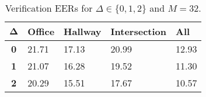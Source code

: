 \begin{table}[h]
    \centering
    \begin{tabular}{|c|M{2cm}|M{2cm}|M{2cm}|M{2cm}|}
    \hline
    $\boldsymbol{\Delta}$ & \bf{Office} & \bf{Hallway} & \bf{Intersection} & \bf{All} \\ 
    \hline 
    \hline
    \bf{0} & 21.71 & 17.13 & 20.99 & 12.93 \\
    \hline
    \bf{1} & 21.07 & 16.28 & 19.52 & 11.30 \\
    \hline
    \bf{2} & 20.29 & 15.51 & 17.67 & 10.57 \\
    \hline
    \end{tabular}
    \caption{Verification EERs for $\Delta \in \{0, 1, 2\}$ and $M = 32$.}
    \label{tab:verify_adapted_m_M_32}
\end{table}
